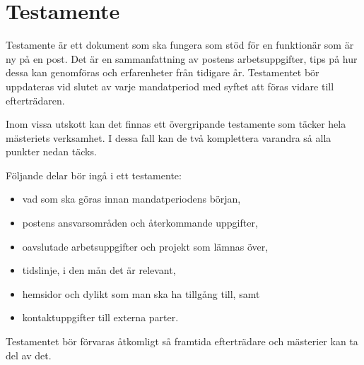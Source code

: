\documentclass{dsekguideline}
\begin{document}
\section{Testamente}
\begin{parasection}
   Testamente är ett dokument som ska fungera som stöd för
  en funktionär som är ny på en post. Det är en sammanfattning av postens
  arbetsuppgifter, tips på hur dessa kan genomföras och erfarenheter från
  tidigare år. Testamentet bör uppdateras vid slutet av varje mandatperiod med
  syftet att föras vidare till efterträdaren.

  Inom vissa utskott kan det finnas ett övergripande testamente som täcker hela
  mästeriets verksamhet. I dessa fall kan de två komplettera varandra så alla
  punkter nedan täcks.

  Följande delar bör ingå i ett testamente:
  \begin{itemize}
    \item vad som ska göras innan mandatperiodens början,
    \item postens ansvarsområden och återkommande uppgifter,
    \item oavslutade arbetsuppgifter och projekt som lämnas över,
    \item tidslinje, i den mån det är relevant,
    \item hemsidor och dylikt som man ska ha tillgång till, samt
    \item kontaktuppgifter till externa parter.
  \end{itemize}

Testamentet bör förvaras åtkomligt så framtida efterträdare och mästerier kan ta
del av det.

\end{parasection}
\end{document}
